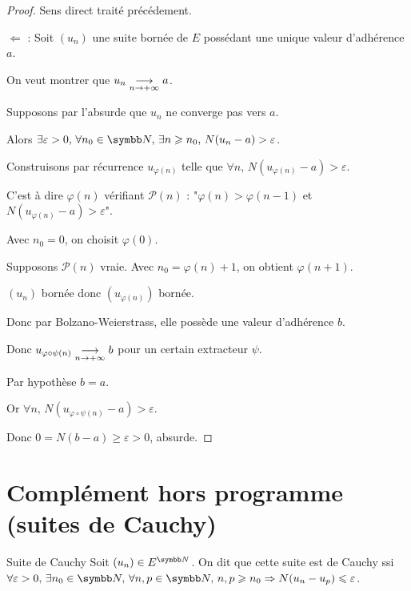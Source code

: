 
\begin{proof}
    Sens direct traité précédement. 

    $\Leftarrow$ : Soit $(u_n)$ une suite bornée de $E$ possédant une unique valeur d'adhérence $a$.

    On veut montrer que $u_n \underset{n \to +\infty}{\longrightarrow} a$.

    Supposons par l'absurde que $u_n$ ne converge pas vers $a$.

    Alors $\exists \varepsilon > 0, \, \forall n_0 \in \N, \, \exists n \geqslant n_0, \, N(u_n - a) > \varepsilon$.

    Construisons par récurrence $u_{\varphi(n)}$ telle que $\forall n, \, N(u_{\varphi(n)} - a) > \varepsilon$.

    C'est à dire $\varphi(n) $ vérifiant $\mathscr P(n)$ : "$\varphi(n) > \varphi(n - 1)$ et $N(u_{\varphi(n)} - a) > \varepsilon$".

    Avec $n_0 = 0$, on choisit $\varphi(0)$.

    Supposons $\mathscr P(n)$ vraie. Avec $n_0 = \varphi(n) + 1$, on obtient $\varphi(n + 1)$.

    $(u_n)$ bornée donc $(u_{\varphi(n)})$ bornée.

    Donc par Bolzano-Weierstrass, elle possède une valeur d'adhérence $b$.

    Donc $u_{\varphi \circ \psi(n)} \underset{n \to +\infty}{\longrightarrow} b$ pour un certain extracteur $\psi$.

    Par hypothèse $b = a$. 

    Or $\forall n, \, N(u_{\varphi \circ \psi(n)} - a) > \varepsilon$.

    Donc $ 0 = N(b - a) \geqslant \varepsilon > 0$, absurde. 
\end{proof}

\section{Complément hors programme (suites de Cauchy)}


\begin{definition}{Suite de Cauchy}{}
    Soit $(u_n) \in E^{\N}$. On dit que cette suite est de Cauchy ssi 
    $\forall \varepsilon > 0, \, \exists n_0 \in \N, \, \forall n, p \in \N, \, n, p \geqslant n_0 \Rightarrow N(u_n - u_p) \leqslant \varepsilon$.
\end{definition}

